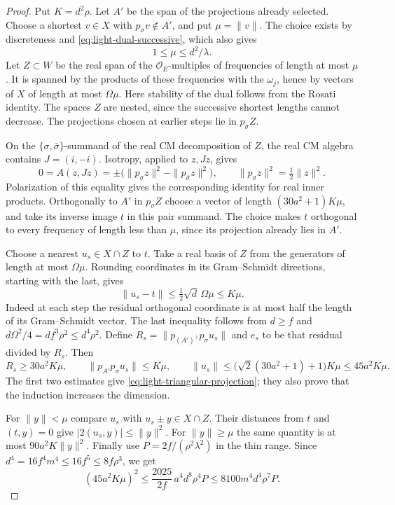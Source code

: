 \begin{proof}
Put \(K=d^2\rho\). Let \(A'\) be the span of the projections
already selected. Choose a shortest \(v\in X\) with
\(p_\sigma v\notin A'\), and put \(\mu=\|v\|\). The choice
exists by discreteness and \eqref{eq:light-dual-successive}, which
also gives
\[
            1\le\mu\le d^2/\lambda .
\]
Let \(Z\subset W\) be the real span of the \(\mathcal O_E\)-multiples
of frequencies of length at most \(\mu\). It is spanned by the
products of these frequencies with the \(\omega_j\), hence by
vectors of \(X\) of length at most \(\Omega\mu\). Here stability
of the dual follows from the Rosati identity. The spaces \(Z\)
are nested, since the successive shortest lengths cannot decrease.
The projections chosen at earlier steps lie in \(p_\sigma Z\).

On the \(\{\sigma,\bar\sigma\}\)-summand of the real CM
decomposition of \(Z\), the real CM algebra contains \(J=(i,-i)\).
Isotropy, applied to \(z,Jz\), gives
\[
 0=A(z,Jz)=\pm\big(\|p_\sigma z\|^2-\|p_{\bar\sigma}z\|^2\big),
 \qquad \|p_\sigma z\|^2=\tfrac12\|z\|^2 .
\]
Polarization of this equality gives the corresponding identity
for real inner products. Orthogonally to \(A'\) in \(p_\sigma Z\)
choose a vector of length \((30a^2+1)K\mu\), and take its inverse
image \(t\) in this pair summand. The choice makes \(t\) orthogonal
to every frequency of length less than \(\mu\), since its
projection already lies in \(A'\).

Choose a nearest \(u_s\in X\cap Z\) to \(t\). Take a real basis
of \(Z\) from the generators of length at most \(\Omega\mu\).
Rounding coordinates in its Gram--Schmidt directions, starting
with the last, gives
\[
   \|u_s-t\|\le\tfrac12\sqrt d\,\Omega\mu\le K\mu .
\]
Indeed at each step the residual orthogonal coordinate is at
most half the length of its Gram--Schmidt vector. The last
inequality follows from \(d\ge f\) and
\(d\Omega^2/4=df^3\rho^2\le d^4\rho^2\).
Define \(R_s=\|p_{(A')^\perp}p_\sigma u_s\|\) and \(e_s\)
to be that residual divided by \(R_s\). Then
\[
 R_s\ge30a^2K\mu,\qquad
 \|p_{A'}p_\sigma u_s\|\le K\mu,\qquad
 \|u_s\|\le\bigl(\sqrt2(30a^2+1)+1\bigr)K\mu\le45a^2K\mu .
\]
The first two estimates give \eqref{eq:light-triangular-projection};
they also prove that the induction increases the dimension.

For \(\|y\|<\mu\) compare \(u_s\) with \(u_s\pm y\in X\cap Z\).
Their distances from \(t\) and \((t,y)=0\) give
\(|2(u_s,y)|\le\|y\|^2\). For \(\|y\|\ge\mu\) the same
quantity is at most \(90a^2K\|y\|^2\). Finally use
\(P=2f/(\rho^2\lambda^2)\) in the thin range. Since
\(d^4=16f^4m^4\le16f^5\le8f\rho^3\), we get
\[
 (45a^2K\mu)^2\le
 \frac{2025}{2f}\,a^4d^8\rho^4P
 \le8100m^4d^4\rho^7P .
\]
\end{proof}

